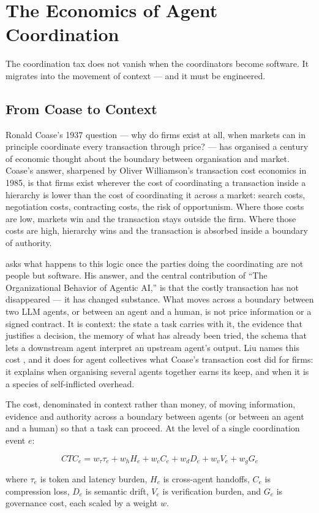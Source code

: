 \chapter{The Economics of Agent Coordination}
\label{ch:coordination-economics}

\epigraph{The coordination tax does not vanish when the coordinators become software. It migrates into the movement of context --- and it must be engineered.}{}

\section{From Coase to Context}

Ronald Coase's 1937 question --- why do firms exist at all, when markets can in principle coordinate every transaction through price? --- has organised a century of economic thought about the boundary between organisation and market. Coase's answer, sharpened by Oliver Williamson's transaction cost economics in 1985, is that firms exist wherever the cost of coordinating a transaction inside a hierarchy is lower than the cost of coordinating it across a market: search costs, negotiation costs, contracting costs, the risk of opportunism. Where those costs are low, markets win and the transaction stays outside the firm. Where those costs are high, hierarchy wins and the transaction is absorbed inside a boundary of authority.

\textcite{Liu2026} asks what happens to this logic once the parties doing the coordinating are not people but software. His answer, and the central contribution of ``The Organizational Behavior of Agentic AI,'' is that the costly transaction has not disappeared --- it has changed substance. What moves across a boundary between two LLM agents, or between an agent and a human, is not price information or a signed contract. It is context: the state a task carries with it, the evidence that justifies a decision, the memory of what has already been tried, the schema that lets a downstream agent interpret an upstream agent's output. Liu names this cost , and it does for agent collectives what Coase's transaction cost did for firms: it explains when organising several agents together earns its keep, and when it is a species of self-inflicted overhead.

\begin{definitionbox}[title={Contextual Transaction Cost (CTC)}]
The cost, denominated in context rather than money, of moving information, evidence and authority across a boundary between agents (or between an agent and a human) so that a task can proceed. At the level of a single coordination event $e$:

\[
CTC_e = w_\tau \tau_e + w_h H_e + w_c C_e + w_d D_e + w_v V_e + w_g G_e
\]

where $\tau_e$ is token and latency burden, $H_e$ is cross-agent handoffs, $C_e$ is compression loss, $D_e$ is semantic drift, $V_e$ is verification burden, and $G_e$ is governance cost, each scaled by a weight $w$.
\end{definitionbox}

